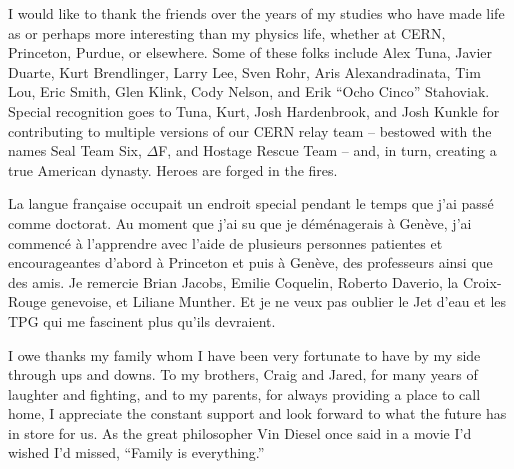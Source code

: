 I would like to thank the friends over the years of my studies
who have made life as or perhaps more interesting than my physics life,
whether at CERN, Princeton, Purdue, or elsewhere.
Some of these folks include Alex Tuna, Javier Duarte, Kurt Brendlinger, Larry Lee, Sven Rohr,
Aris Alexandradinata, Tim Lou, Eric Smith, Glen Klink, Cody Nelson, and Erik ``Ocho Cinco'' Stahoviak.
Special recognition goes to Tuna, Kurt, Josh Hardenbrook, and Josh Kunkle for contributing
to multiple versions of our CERN relay team -- bestowed with the names Seal Team Six, $\Delta$F,
and Hostage Rescue Team -- and, in turn, creating a true American dynasty.
Heroes are forged in the fires.

La langue française occupait un endroit special pendant le temps que j'ai passé comme doctorat.
Au moment que j'ai su que je déménagerais à Genève, j'ai commencé à l'apprendre avec l'aide de
plusieurs personnes patientes et encourageantes d'abord à Princeton et puis à Genève,
des professeurs ainsi que des amis.
Je remercie Brian Jacobs, Emilie Coquelin, Roberto Daverio, la Croix-Rouge genevoise,
et Liliane Munther. Et je ne veux pas oublier le Jet d'eau et les TPG qui me fascinent
plus qu'ils devraient.

I owe thanks my family whom I have been very fortunate to have by my side through ups and
downs. To my brothers, Craig and Jared, for many years of laughter and fighting, and
to my parents, for always providing a place to call home, I appreciate the constant support
and look forward to what the future has in store for us.
As the great philosopher Vin Diesel once said in a movie I'd wished I'd missed,
``Family is everything.''

